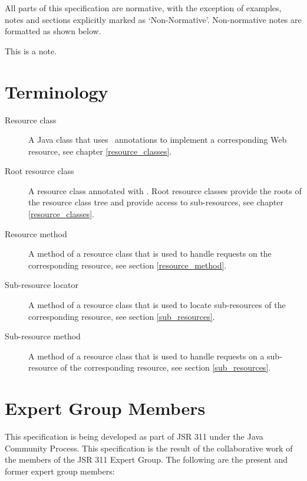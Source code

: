 All parts of this specification are normative, with the exception of examples, notes and sections explicitly marked as `Non-Normative'. Non-normative notes are formatted as shown below.

\begin{nnnote*}
This is a note.
\end{nnnote*}

\section{Terminology}

\begin{description}
\item[Resource class] A Java class that uses \jaxrs\ annotations to implement a corresponding Web resource, see chapter \ref{resource_classes}.
\item[Root resource class] A resource class annotated with \UriTemplate. Root resource classes provide the roots of the resource class tree and provide access to sub-resources, see chapter \ref{resource_classes}.
\item[Resource method] A method of a resource class that is used to handle requests on the corresponding resource, see section \ref{resource_method}.
\item[Sub-resource locator] A method of a resource class that is used to locate sub-resources of the corresponding resource, see section \ref{sub_resources}.
\item[Sub-resource method] A method of a resource class that is used to handle requests on a sub-resource of the corresponding resource, see section \ref{sub_resources}.
\end{description}

\section{Expert Group Members} 

This specification is being developed as part of JSR 311 under the Java Community Process. This specification is the result of the collaborative work of the members of the JSR 311 Expert Group. The following are the present and former expert group members:

